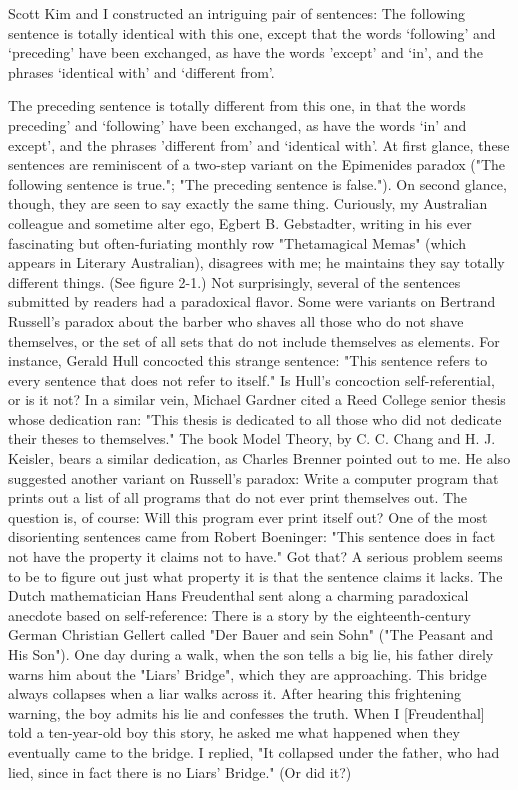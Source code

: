 Scott Kim and I constructed an intriguing pair of sentences: 
The following sentence is totally identical with this one, except that the words `following' and `preceding' have been exchanged, as have the words 'except' and `in', and the phrases `identical with' and `different from'. 



The preceding sentence is totally different from this one, in that the words preceding' and `following' have been exchanged, as have the words `in' and except', and the phrases 'different from' and `identical with'. 
At first glance, these sentences are reminiscent of a two-step variant on the Epimenides paradox ("The following sentence is true."; "The preceding sentence is false."). On second glance, though, they are seen to say exactly the same thing. Curiously, my Australian colleague and sometime alter ego, Egbert B. Gebstadter, writing in his ever fascinating but often-furiating monthly row "Thetamagical Memas" (which appears in Literary Australian), disagrees with me; he maintains they say totally different things. (See figure 2-1.) Not surprisingly, several of the sentences submitted by readers had a paradoxical flavor. Some were variants on Bertrand Russell's paradox about the barber who shaves all those who do not shave themselves, or the set of all sets that do not include themselves as elements. For instance, Gerald Hull concocted this strange sentence: "This sentence refers to every sentence that does not refer to itself." Is Hull's concoction self-referential, or is it not? In a similar vein, Michael Gardner cited a Reed College senior thesis whose dedication ran: "This thesis is dedicated to all those who did not dedicate their theses to themselves." The book Model Theory, by C. C. Chang and H. J. Keisler, bears a similar dedication, as Charles Brenner pointed out to me. He also suggested another variant on Russell's paradox: Write a computer program that prints out a list of all programs that do not ever print themselves out. The question is, of course: Will this program ever print itself out? One of the most disorienting sentences came from Robert Boeninger: "This sentence does in fact not have the property it claims not to have." Got that? A serious problem seems to be to figure out just what property it is that the sentence claims it lacks. The Dutch mathematician Hans Freudenthal sent along a charming paradoxical anecdote based on self-reference: 
There is a story by the eighteenth-century German Christian Gellert called "Der Bauer and sein Sohn" ("The Peasant and His Son"). One day during a walk, when the son tells a big lie, his father direly warns him about the "Liars' Bridge", which they are approaching. This bridge always collapses when a liar walks across it. After hearing this frightening warning, the boy admits his lie and confesses the truth. When I [Freudenthal] told a ten-year-old boy this story, he asked me what happened when they eventually came to the bridge. I replied, "It collapsed under the father, who had lied, since in fact there is no Liars' Bridge." (Or did it?) 

